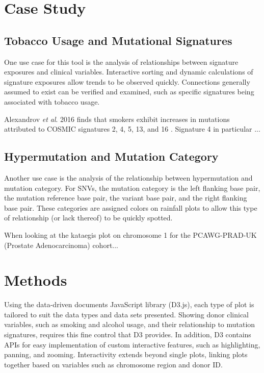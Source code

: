\documentclass[12pt, letterpaper]{article}
\begin{document}
\section{Case Study}

\subsection{Tobacco Usage and Mutational Signatures}
One use case for this tool is the analysis of relationships between signature exposures and clinical variables.
Interactive sorting and dynamic calculations of signature exposures allow trends to be observed quickly.
Connections generally assumed to exist can be verified and examined, such as specific signatures being associated with tobacco usage.

Alexandrov \textit{et al}. 2016 finds that smokers exhibit increases in mutations attributed to COSMIC signatures 2, 4, 5, 13, and 16 \cite{alexandrov2016mutational}. 
Signature 4 in particular ...

\subsection{Hypermutation and Mutation Category}
Another use case is the analysis of the relationship between hypermutation and mutation category.
For SNVs, the mutation category is the left flanking base pair, the mutation reference base pair, the variant base pair, and the right flanking base pair.
These categories are assigned colors on rainfall plots to allow this type of relationship (or lack thereof) to be quickly spotted.

When looking at the kataegis plot on chromosome 1 for the PCAWG-PRAD-UK (Prostate Adenocarcinoma) cohort...



\section{Methods}
Using the data-driven documents JavaScript library (D3.js)\cite{bostock2011d3}, each type of plot is tailored to suit the data types and data sets presented.
Showing donor clinical variables, such as smoking and alcohol usage, and their relationship to mutation signatures, requires this fine control that D3 provides.
In addition, D3 contains APIs for easy implementation of custom interactive features, such as highlighting, panning, and zooming.
Interactivity extends beyond single plots, linking plots together based on variables such as chromosome region and donor ID.
\end{document}
